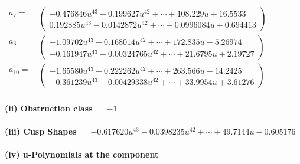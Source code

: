 \documentclass[1p]{elsarticle_modified}
\theoremstyle{definition}
\begin{document}
\begin{tabular}{m{7pt} m{180pt} m{7pt} m{180pt} }
\flushright $a_{7}=$&$\begin{pmatrix}-0.476846 u^{43}-0.199627 u^{42}+\cdots+108.229 u+16.5533\\0.192885 u^{43}-0.0142872 u^{42}+\cdots-0.0996084 u+0.694413\end{pmatrix}$ \\
\flushright $a_{3}=$&$\begin{pmatrix}-1.09702 u^{43}-0.168014 u^{42}+\cdots+172.835 u-5.26974\\-0.161947 u^{43}-0.00324765 u^{42}+\cdots+21.6795 u+2.19727\end{pmatrix}$ \\
\flushright $a_{10}=$&$\begin{pmatrix}-1.65580 u^{43}-0.222262 u^{42}+\cdots+263.566 u-14.2425\\-0.361239 u^{43}-0.00429338 u^{42}+\cdots+33.9954 u+3.61276\end{pmatrix}$\\&\end{tabular}
\flushleft \textbf{(ii) Obstruction class $= -1$}\\~\\
\flushleft \textbf{(iii) Cusp Shapes $= -0.617620 u^{43}-0.0398235 u^{42}+\cdots+49.7144 u-0.605176$}\\~\\
\newpage\renewcommand{\arraystretch}{1}
\flushleft \textbf{(iv) u-Polynomials at the component}\newline \\
\end{document}
